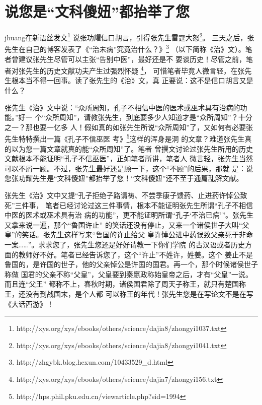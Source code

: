 \chapter{说您是“文科傻妞”都抬举了您}

\subtitle{——评张功耀《“治未病”究竟治什么？》}

jhuang在新语丝发文\footnote{http://xys.org/xys/ebooks/others/science/dajia8/zhongyi1037.txt}
说张功耀信口胡言，引得张先生雷霆大怒\footnote{http://xys.org/xys/ebooks/others/science/dajia8/zhongyi1041.txt}。
三天之后，张先生在自己的博客发表了《“治未病”究竟治什么？》\footnote{http://zhgybk.blog.hexun.com/10433529\_d.html}
（以下简称《治》文）。笔者曾建议张先生尽管可以主张“告别中医”，最好还是不
要谈历史！尽管之前，笔者对张先生的历史文献功夫产生过强烈怀疑
\footnote{http://xys.org/xys/ebooks/others/science/dajia7/zhongyi156.txt}，
可惜笔者毕竟人微言轻，在张先生根本当不得一回事。读了张先生的《治》文，真
正要说：这不是信口胡言又是什么？

张先生《治》文中说：“众所周知，孔子不相信中医的医术或巫术具有治病的功能。”好一
个“众所周知”，请教张先生，到底要多少人知道才是“众所周知”？十分之一？那也要一亿多
人！假如真的如张先生所说“众所周知”了，又如何有必要张先生特特撰出一篇《孔子不信巫医
考》\footnote{http://hps.phil.pku.edu.cn/viewarticle.php?sid=1994}这样的浑身是洞
的文章？难道张先生真的以为您一篇文章就真的能“众所周知”了。笔者
曾撰文讨论过张先生所用的历史文献根本不能证明“孔子不信巫医”，正如笔者所讲，笔者人
微言轻，张先生当然可以不屑一顾。不过，张先生最好还是顾一下，这个“不顾”的后果，那就
是：说您张功耀先生是“文科傻妞”都抬举了您！“文科傻妞”还不至于通篇乱解文献。

张先生《治》文中又提“孔子拒绝子路请祷、不尝季康子馈药、止进药许悼公致死”三件事，
笔者已经讨论过这三件事情，根本不能证明张先生所谓“孔子不相信中医的医术或巫术具有治
病的功能”，更不能证明所谓“孔子‘不治已病’”。张先生又拿来说一遍，那个“鲁国许止”
的笑话还没有停止，又来一个诸侯世子大叫“父皇”的笑话。张先生这样写来“鲁国的许止给父
皇许悼公进中药误致父亲死于非命一案……”。求求您了，张先生您还是好好请教一下你们学院
的古汉语或者历史方面的教师好不好。笔者已经告诉您了，这个“许止”不姓许，姓姜。这个
姜止不是鲁国的，是许国的世子，他的父亲悼公是许国的国君。再一个，那个时候诸侯世子称做
国君的父亲不称“父皇”，父皇要到秦嬴政称始皇帝之后，才有“父皇”一说。而且连“父王”
都称不上，春秋时期，诸侯国君除了周天子称王，就只有楚国称王，还没有到战国末，是个人都
可以称王的年代！张先生您是在写论文不是在写《大话西游》！

